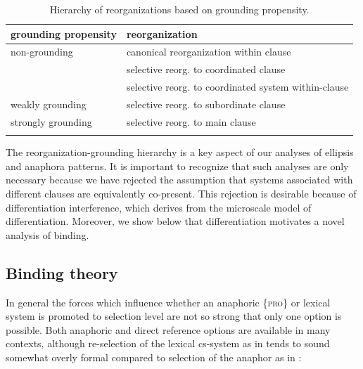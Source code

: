 \begin{table}
\begin{tabularx}{\textwidth}{Xl}
\lsptoprule
\textbf{grounding propensity} & \textbf{reorganization}\\
\midrule
non-grounding & canonical reorganization within clause\\
& selective reorg. to coordinated clause\\
& selective reorg. to coordinated system within-clause\\
\midrule
weakly grounding & selective reorg. to subordinate clause\\
\midrule
strongly grounding & selective reorg. to main clause\\
\lspbottomrule
\end{tabularx}
\caption{Hierarchy of reorganizations based on grounding propensity.}\label{tab:7:3}
\end{table}

  The reorganization-grounding hierarchy is a key aspect of our analyses of ellipsis and anaphora patterns. It is important to recognize that such analyses are only necessary because we have rejected the assumption that systems associated with different clauses are equivalently co-present. This rejection is desirable because of differentiation interference, which derives from the microscale model of differentiation. Moreover, we show below that differentiation motivates a novel analysis of binding.

\subsection{Binding theory}

In general the forces which influence whether an anaphoric \{\textsc{pro}\} or lexical system is promoted to selection level are not so strong that only one option is possible. Both anaphoric and direct reference options are available in many contexts, although re-selection of the lexical cs-system as in  tends to sound somewhat overly formal compared to selection of the anaphor as in :

\ea\label{ex:7:13}
   \label{ex:7:13a}
    \label{ex:7:13b}
\z
\z

